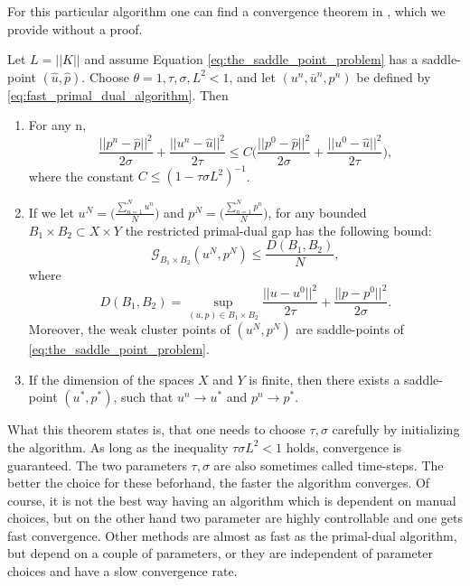     For this particular algorithm one can find a convergence theorem in \cite{Chambolle10afirst-order}, which we provide without a proof.

    \begin{theorem} %
    \label{the:primal_dual_convergence}
        Let $L = ||K||$ and assume Equation \ref{eq:the_saddle_point_problem} has a saddle-point $(\hat{u}, \hat{p})$. Choose $\theta = 1, \tau, \sigma, L^{2} < 1$, and let $(u^{n}, \bar{u}^{n}, p^{n})$ be defined by \ref{eq:fast_primal_dual_algorithm}. Then
            \begin{enumerate}
                \item For any n,
                    $$
                        \frac{||p^{n} - \hat{p}||^{2}}{2\sigma} + \frac{||u^{n} - \hat{u}||^{2}}{2\tau} \le C \bigg( \frac{||p^{0} - \hat{p}||^{2}}{2\sigma} + \frac{||u^{0} - \hat{u}||^{2}}{2\tau} \bigg),
                    $$
                where the constant $C \le (1 - \tau\sigma L^{2})^{-1}$.
                \item If we let $u^{N} = \bigg( \frac{\sum\limits_{n=1}^{N} u^{n}}{N} \bigg)$ and $p^{N} = \bigg( \frac{\sum\limits_{n=1}^{N} p^{n}}{N} \bigg)$, for any bounded $B_{1} \times B_{2} \subset X \times Y$ the restricted primal-dual gap has the following bound:
                    $$
                        \mathcal{G}_{B_{1} \times B_{2}}(u^{N}, p^{N}) \le \frac{D(B_{1}, B_{2})}{N},
                    $$
                where
                    $$
                        D(B_{1}, B_{2}) = \sup_{(u, p) \in B_{1} \times B_{2}} \frac{||u - u^{0}||^{2}}{2\tau} + \frac{||p - p^{0}||^{2}}{2\sigma}.
                    $$
                Moreover, the weak cluster points of $(u^{N}, p^{N})$ are saddle-points of \ref{eq:the_saddle_point_problem}.
                \item If the dimension of the spaces $X$ and $Y$ is finite, then there exists a saddle-point $(u^{\ast}, p^{\ast})$, such that $u^{n} \longrightarrow u^{\ast}$ and $p^{n} \longrightarrow p^{\ast}$.
            \end{enumerate}
    \end{theorem}

    \begin{remark}
        What this theorem states is, that one needs to choose $\tau, \sigma$ carefully by initializing the algorithm. As long as the inequality $\tau\sigma L^{2} < 1$ holds, convergence is guaranteed. The two parameters $\tau, \sigma$ are also sometimes called time-steps. The better the choice for these beforhand, the faster the algorithm converges. Of course, it is not the best way having an algorithm which is dependent on manual choices, but on the other hand two parameter are highly controllable and one gets fast convergence. Other methods are almost as fast as the primal-dual algorithm, but depend on a couple of parameters, or they are independent of parameter choices and have a slow convergence rate.
    \end{remark}

